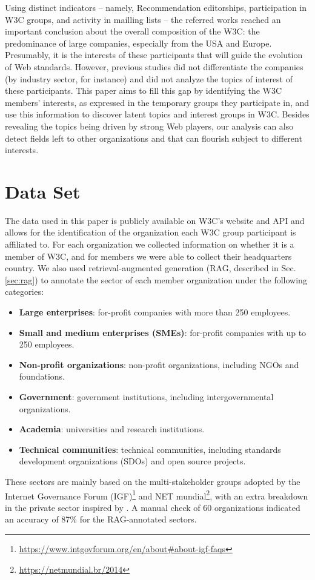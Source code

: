 \documentclass[sigconf, nonacm]{acmart}              %
\begin{document}
Using distinct indicators -- namely, Recommendation editorships, participation in W3C groups, and activity in mailling lists -- the referred works reached an important conclusion about the overall composition of the W3C: the predominance of large companies, especially from the USA and Europe. Presumably, it is the interests of these participants that will guide the evolution of Web standards. However, previous studies did not differentiate the companies (by industry sector, for instance) and did not analyze the topics of interest of these participants. This paper aims to fill this gap by identifying the W3C members' interests, as expressed in the temporary groups they participate in, and use this information to discover latent topics and interest groups in W3C. Besides revealing the topics being driven by strong Web players, our analysis can also detect fields left to other organizations and that can flourish subject to different interests. 

 
\section{Data Set}
\label{sec:data}

The data used in this paper is publicly available on W3C's website and API and allows for the identification of the organization each W3C group participant is affiliated to. For each organization we collected information on whether it is a member of W3C, and for members we were able to collect their headquarters country. We also used retrieval-augmented generation (RAG, described in Sec. \ref{sec:rag}) to annotate the sector of each member organization under the following categories: 
\begin{itemize}
  \item \textbf{Large enterprises}: for-profit companies with more than 250 employees.
  \item \textbf{Small and medium enterprises (SMEs)}: for-profit companies with up to 250 employees.
  \item \textbf{Non-profit organizations}: non-profit organizations, including NGOs and foundations.
  \item \textbf{Government}: government institutions, including intergovernmental organizations. 
  \item \textbf{Academia}: universities and research institutions.
  \item \textbf{Technical communities}: technical communities, including standards development organizations (SDOs) and open source projects.
\end{itemize}
These sectors are mainly based on the multi-stakeholder groups adopted by the Internet Governance Forum (IGF)\footnote{\url{https://www.intgovforum.org/en/about\#about-igf-faqs}} and NET mundial\footnote{\url{https://netmundial.br/2014}}, with an extra breakdown in the private sector inspired by \cite{Gamalielsson2016,Harcourt2020}. A manual check of 60 organizations indicated an accuracy of 87\% for the RAG-annotated sectors.
\end{document}

